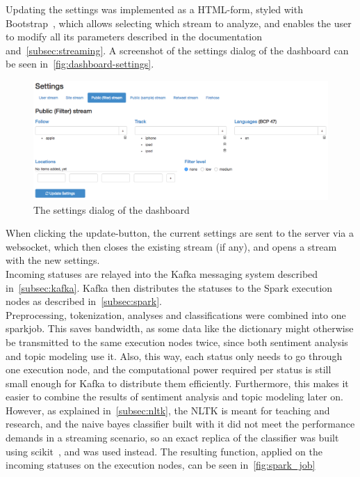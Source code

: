 Updating the settings was implemented as a HTML-form, styled with Bootstrap~\cite{bootstrapDocs},
which allows selecting which stream to analyze, and enables the user to modify all its parameters
described in the documentation~\cite{twitterDocs} and~\autoref{subsec:streaming}.
A screenshot of the settings dialog of the dashboard can be seen in~\autoref{fig:dashboard-settings}.

\begin{figure}
    \centering
    \caption{The settings dialog of the dashboard}
    \label{fig:dashboard-settings}
    \includegraphics[width=\textwidth]{../images/dashboard_settings.png}
\end{figure}

When clicking the update-button, the current settings are sent to the server via a websocket,
which then closes the existing stream (if any), and opens a stream with the new settings.
\\%
Incoming statuses are relayed into the Kafka messaging system described in~\autoref{subsec:kafka}.
Kafka then distributes the statuses to the Spark execution nodes as described in~\autoref{subsec:spark}.
\\
Preprocessing, tokenization, analyses and classifications were combined into one sparkjob.
This saves bandwidth, as some data like the dictionary might otherwise be transmitted to the same execution nodes twice,
since both sentiment analysis and topic modeling use it.
Also, this way, each status only needs to go through one execution node,
and the computational power required per status is still small enough for Kafka to distribute them efficiently.
Furthermore, this makes it easier to combine the results of sentiment analysis and topic modeling later on.
However, as explained in~\autoref{subsec:nltk}, the NLTK is meant for teaching and research,
and the naive bayes classifier built with it did not meet the performance demands in a streaming scenario,
so an exact replica of the classifier was built using scikit~\cite{scikitDocs}, and was used instead.
The resulting function, applied on the incoming statuses on the execution nodes, can be seen in~\autoref{fig:spark_job}

